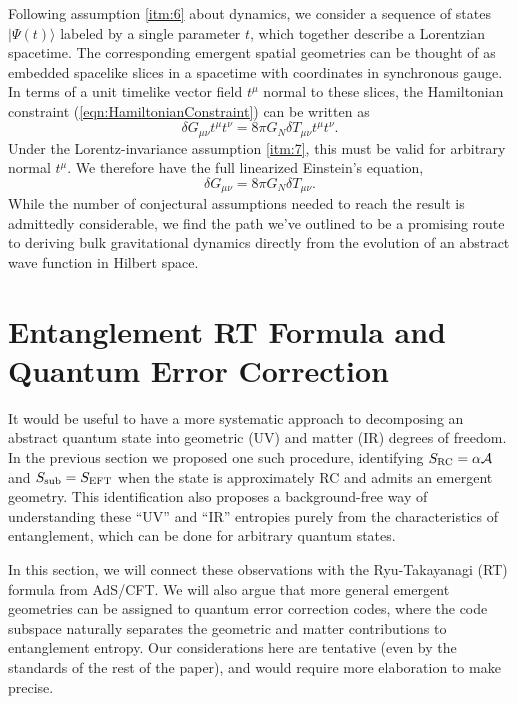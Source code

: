 \documentclass[%
preprint,
nofootinbib,
amsmath,amssymb,
aps,
prd,
showpacs,
superscriptaddress
]{revtex4-1}
\newcommand{\area}{\mathcal{A}}
\begin{document}
Following assumption \ref{itm:6} about dynamics, we consider a sequence of states $|\Psi (t)\rangle$ labeled by a single parameter $t$, which together describe a Lorentzian spacetime.
The corresponding emergent spatial geometries can be thought of as embedded spacelike slices in a spacetime with coordinates in synchronous gauge.
In terms of a unit timelike vector field $t^\mu$ normal to these slices, the Hamiltonian constraint (\ref{eqn:HamiltonianConstraint}) can be written as 
\begin{equation}
\delta G_{\mu\nu}t^{\mu}t^{\nu}= 8\pi G_N \delta T_{\mu\nu}t^{\mu}t^{\nu}.
\end{equation}
Under the Lorentz-invariance assumption \ref{itm:7}, this must be valid for arbitrary normal $t^{\mu}$. 
We therefore have the full linearized Einstein's equation,
\begin{equation}
\delta G_{\mu\nu}= 8\pi G_N \delta T_{\mu\nu}.
\end{equation}
While the number of conjectural assumptions needed to reach the result is admittedly considerable, we find the path we've outlined to be a promising route to deriving bulk gravitational dynamics directly from the evolution of an abstract wave function in Hilbert space.

\section{Entanglement RT Formula and Quantum Error Correction}\label{sec:generalizeRT}

It would be useful to have a more systematic approach to decomposing an abstract quantum state into geometric (UV) and matter (IR) degrees of freedom.
In the previous section we proposed one such procedure, identifying $S_{\rm RC}= \alpha \area$ and $S_{\mathrm{sub}}=S_{\rm EFT}$ when the state is approximately RC and admits an emergent geometry. This identification also proposes a background-free way of understanding these ``UV'' and ``IR'' entropies purely from the characteristics of entanglement, which can be done for arbitrary quantum states. 

In this section, we will connect these observations with the Ryu-Takayanagi (RT) formula from AdS/CFT. We will also argue that more general emergent geometries can be assigned to quantum error correction codes, where the code subspace naturally separates the geometric and matter contributions to entanglement entropy. Our considerations here are tentative (even by the standards of the rest of the paper), and would require more elaboration to make precise. 
\end{document}
